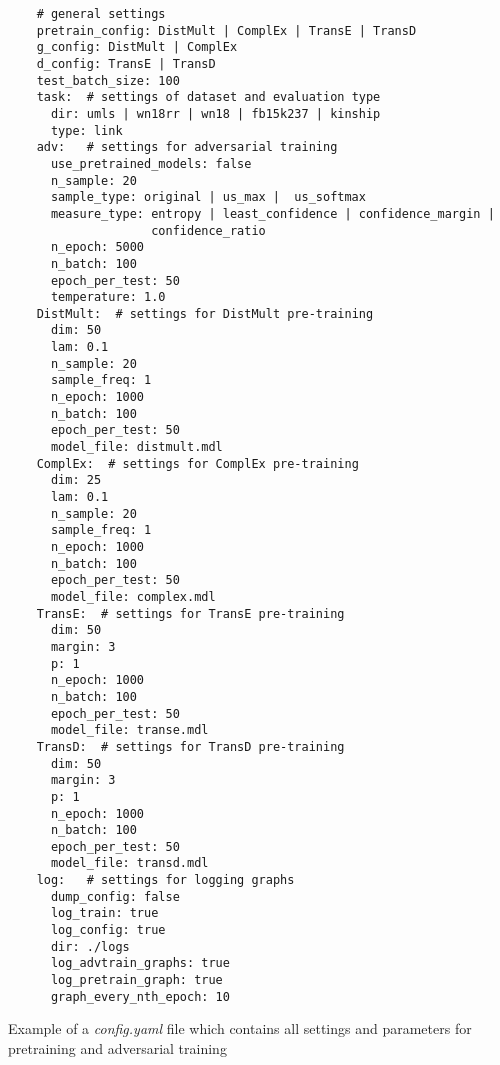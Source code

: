 \begin{longlisting}
  \begin{verbatim}
    # general settings
    pretrain_config: DistMult | ComplEx | TransE | TransD
    g_config: DistMult | ComplEx
    d_config: TransE | TransD
    test_batch_size: 100 
    task:  # settings of dataset and evaluation type
      dir: umls | wn18rr | wn18 | fb15k237 | kinship
      type: link
    adv:   # settings for adversarial training
      use_pretrained_models: false
      n_sample: 20 
      sample_type: original | us_max |  us_softmax
      measure_type: entropy | least_confidence | confidence_margin | 
                    confidence_ratio  
      n_epoch: 5000
      n_batch: 100 
      epoch_per_test: 50
      temperature: 1.0
    DistMult:  # settings for DistMult pre-training
      dim: 50
      lam: 0.1
      n_sample: 20
      sample_freq: 1
      n_epoch: 1000
      n_batch: 100
      epoch_per_test: 50
      model_file: distmult.mdl
    ComplEx:  # settings for ComplEx pre-training
      dim: 25
      lam: 0.1
      n_sample: 20
      sample_freq: 1
      n_epoch: 1000 
      n_batch: 100 
      epoch_per_test: 50
      model_file: complex.mdl
    TransE:  # settings for TransE pre-training
      dim: 50
      margin: 3
      p: 1
      n_epoch: 1000 
      n_batch: 100 
      epoch_per_test: 50
      model_file: transe.mdl
    TransD:  # settings for TransD pre-training
      dim: 50
      margin: 3
      p: 1
      n_epoch: 1000 
      n_batch: 100
      epoch_per_test: 50
      model_file: transd.mdl
    log:   # settings for logging graphs
      dump_config: false
      log_train: true
      log_config: true
      dir: ./logs
      log_advtrain_graphs: true
      log_pretrain_graph: true
      graph_every_nth_epoch: 10
\end{verbatim}
  \caption{Example of a \textit{config.yaml} file which contains all settings and parameters for pretraining and adversarial training}
  \label{lst:config_yaml}
\end{longlisting}